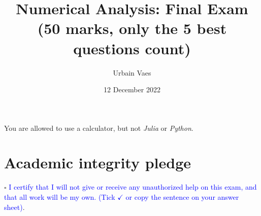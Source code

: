 \documentclass[11pt]{article}
\theoremstyle{definition}
\theoremstyle{remark}
\theoremstyle{plain}%
\begin{document}
\title{Numerical Analysis: Final Exam \\
\small{(\textbf{50 marks}, only the 5 best questions count)}}
\author{Urbain Vaes}
\date{12 December 2022}
\maketitle

\noindent You are allowed to use a calculator, but not \emph{Julia} or \emph{Python}.

\section*{Academic integrity pledge}
\noindent $\square$ \textcolor{blue}{I certify that I will not give or receive any unauthorized help on this exam,
and that all work will be my own. (Tick $\checkmark$ or copy the sentence on your answer sheet)}.
\end{document}
